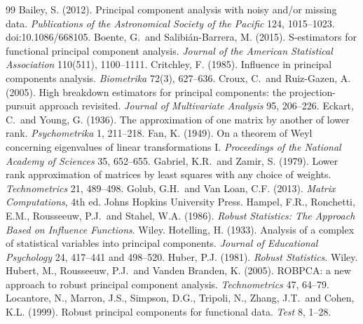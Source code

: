 \documentclass[11pt]{article}
\theoremstyle{definition}
\theoremstyle{remark}
\begin{document}
\begin{thebibliography}{99}\small
{}
Bailey, S. (2012). Principal component analysis with noisy and/or missing data.
\emph{Publications of the Astronomical Society of the Pacific} 124, 1015--1023. doi:10.1086/668105.
Boente, G.\ and Salibi\'an-Barrera, M. (2015). S-estimators for functional principal component analysis.
\emph{Journal of the American Statistical Association} 110(511), 1100--1111.
Critchley, F. (1985). Influence in principal components analysis. \emph{Biometrika} 72(3), 627--636.
Croux, C.\ and Ruiz-Gazen, A. (2005). High breakdown estimators for principal components: the projection-pursuit
approach revisited. \emph{Journal of Multivariate Analysis} 95, 206--226.
Eckart, C.\ and Young, G. (1936). The approximation of one matrix by another of lower rank. \emph{Psychometrika} 1, 211--218.
Fan, K. (1949). On a theorem of Weyl concerning eigenvalues of linear transformations I.
\emph{Proceedings of the National Academy of Sciences} 35, 652--655.
Gabriel, K.R.\ and Zamir, S. (1979). Lower rank approximation of matrices by least squares with any choice of weights.
\emph{Technometrics} 21, 489--498.
Golub, G.H.\ and Van Loan, C.F. (2013). \emph{Matrix Computations}, 4th ed. Johns Hopkins University Press.
Hampel, F.R., Ronchetti, E.M., Rousseeuw, P.J.\ and Stahel, W.A. (1986). \emph{Robust Statistics: The Approach Based on
Influence Functions}. Wiley.
Hotelling, H. (1933). Analysis of a complex of statistical variables into principal components.
\emph{Journal of Educational Psychology} 24, 417--441 and 498--520.
Huber, P.J. (1981). \emph{Robust Statistics}. Wiley.
Hubert, M., Rousseeuw, P.J.\ and Vanden Branden, K. (2005). ROBPCA: a new approach to robust principal component
analysis. \emph{Technometrics} 47, 64--79.
Locantore, N., Marron, J.S., Simpson, D.G., Tripoli, N., Zhang, J.T.\ and Cohen, K.L. (1999). Robust principal
components for functional data. \emph{Test} 8, 1--28.

\end{thebibliography}
\end{document}
